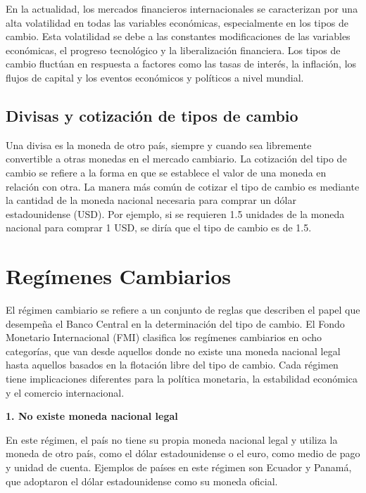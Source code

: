 \documentclass[
  letterpaper,
  DIV=11,
  numbers=noendperiod]{scrartcl}
\begin{document}
En la actualidad, los mercados financieros internacionales se
caracterizan por una alta volatilidad en todas las variables económicas,
especialmente en los tipos de cambio. Esta volatilidad se debe a las
constantes modificaciones de las variables económicas, el progreso
tecnológico y la liberalización financiera. Los tipos de cambio fluctúan
en respuesta a factores como las tasas de interés, la inflación, los
flujos de capital y los eventos económicos y políticos a nivel mundial.

\hypertarget{divisas-y-cotizaciuxf3n-de-tipos-de-cambio}{%
\subsection{Divisas y cotización de tipos de
cambio}\label{divisas-y-cotizaciuxf3n-de-tipos-de-cambio}}

Una divisa es la moneda de otro país, siempre y cuando sea libremente
convertible a otras monedas en el mercado cambiario. La cotización del
tipo de cambio se refiere a la forma en que se establece el valor de una
moneda en relación con otra. La manera más común de cotizar el tipo de
cambio es mediante la cantidad de la moneda nacional necesaria para
comprar un dólar estadounidense (USD). Por ejemplo, si se requieren 1.5
unidades de la moneda nacional para comprar 1 USD, se diría que el tipo
de cambio es de 1.5.

\hypertarget{reguxedmenes-cambiarios}{%
\section{Regímenes Cambiarios}\label{reguxedmenes-cambiarios}}

El régimen cambiario se refiere a un conjunto de reglas que describen el
papel que desempeña el Banco Central en la determinación del tipo de
cambio. El Fondo Monetario Internacional (FMI) clasifica los regímenes
cambiarios en ocho categorías, que van desde aquellos donde no existe
una moneda nacional legal hasta aquellos basados en la flotación libre
del tipo de cambio. Cada régimen tiene implicaciones diferentes para la
política monetaria, la estabilidad económica y el comercio
internacional.

\textbf{1. No existe moneda nacional legal}

En este régimen, el país no tiene su propia moneda nacional legal y
utiliza la moneda de otro país, como el dólar estadounidense o el euro,
como medio de pago y unidad de cuenta. Ejemplos de países en este
régimen son Ecuador y Panamá, que adoptaron el dólar estadounidense como
su moneda oficial.
\end{document}
